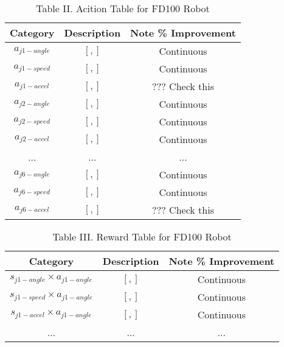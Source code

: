 \documentclass[conference]{IEEEtran}
\begin{document}
\begin{table}[H] %
\renewcommand{\arraystretch}{1.3}
\caption{Table II. Acition Table for FD100 Robot}
\label{state-Table1}
\centering
\begin{tabular}{|c||c||c|}
\hline
Category     & Description    & Note    \% Improvement \\
\hline
$a_{j1-angle}$     & $[,]$ & Continuous \\
\hline
$a_{j1-speed}$     & $[,]$ & Continuous \\
\hline 
$a_{j1-accel}$     & $[,]$ & ??? Check this \\
\hline 
$a_{j2-angle}$     & $[,]$ & Continuous \\
\hline
$a_{j2-speed}$     & $[,]$ & Continuous \\
\hline 
$a_{j2-accel}$     & $[,]$ & Continuous \\
\hline 
...     & ... & ... \\
\hline 
$a_{j6-angle}$     & $[,]$ & Continuous \\
\hline
$a_{j6-speed}$     & $[,]$ & Continuous \\
\hline 
$a_{j6-accel}$     & $[,]$ & ??? Check this \\
\hline 
\end{tabular}
\end{table}

\begin{table}[H] %
\renewcommand{\arraystretch}{1.3}
\caption{Table III. Reward Table for FD100 Robot}
\label{state-Table1}
\centering
\begin{tabular}{|c||c||c|}
\hline
Category     & Description    & Note    \% Improvement \\
\hline
$s_{j1-angle} \times a_{j1-angle}$     & $[,]$ & Continuous \\
\hline
$s_{j1-speed} \times a_{j1-angle}$    & $[,]$ & Continuous \\
\hline 
$s_{j1-accel} \times a_{j1-angle}$     & $[,]$ & Continuous \\
\hline 
...     & ... & ... \\
\hline 
\end{tabular}
\end{table}
\end{document}
